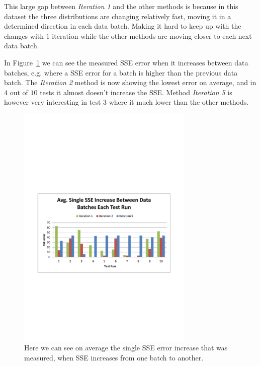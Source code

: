 This large gap between \textit{Iteration 1} and the other methods is because in this dataset the three distributions are changing relatively fast, moving it in a determined direction in each data batch. Making it hard to keep up with the changes with $1$-iteration while the other methods are moving closer to each next data batch.

In Figure~\ref{fig:results_gen_AvgIncreaseEachTestRun} we can see the measured SSE error when it increases between data batches, e.g. where a SSE error for a batch is higher than the previous data batch. The \textit{Iteration 2} method is now showing the lowest error on average, and in $4$ out of $10$ tests it almost doesn't increase the SSE. Method \textit{Iteration 5} is however very interesting in test $3$ where it much lower than the other methods. 

\begin{figure}[ht]
\centering
\includegraphics[trim = 10mm 90mm 10mm 100mm, clip, width=0.75\textwidth]{Figures/experiments/gen_AvgSingleSSEIncreaseBetweenDataBatchesEachTestRun.pdf}
\caption{Here we can see on average the single SSE error increase that was measured, when SSE increases from one batch to another. }
\label{fig:results_gen_AvgIncreaseEachTestRun}
\end{figure}

